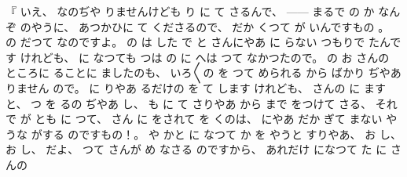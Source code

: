 %
『
いえ、
%
なのぢや
りませんけども
り
に
て
さるんで、
%
{---}{---}%
まるで
の
か%
なんぞ
のやうに、
%
あつかひに
て
くださるので、
%
だか
くつて
が
いんですもの
。
%
%
の
だつて
なのですよ。
%
の
は
した
で
と
さんにやあ
に
らない
つもりで
たんです
けれども、
%
に
%
なつても
つは
の
に
へは
つて
なかつたので。
%
の
%
お
さんの
ところに
ることに
ましたのも、
%
いろ〳〵の
を
つて
められる
から
ばかり
ぢやあ
りません
ので。
%
に
りやあ
るだけの
を
て
します
けれども、
%
さんの
%
に
ますと、
%
つ
を
るの
ぢやあ
し、
%
も
に
て
さりやあ
から
まで
をつけて
さる、
%
それで
が
とも
に
つて、
%
さん
に
をされて
を
%
くのは、
%
にやあ
だか
ぎて
まない
やうな
がする
のですもの！。
%
や%
かと
に
なつて
か
を
やうと
すりやあ、
%
お
し、
%
お
し、
%
だよ、
%
つて
さんが
め
なさる
のですから、
%
あれだけ
になつて
た
に
さんの
%
